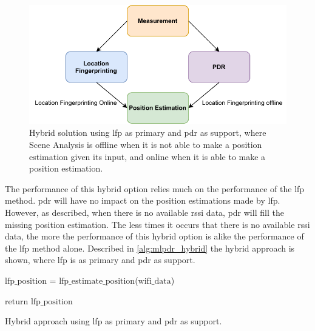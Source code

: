 \begin{figure}[H]
    \centering
    \includegraphics[scale=0.85]{Images/Experiments/hybrid/approach1.pdf}
    \caption{Hybrid solution using \gls{lfp} as primary and \gls{pdr} as support, where Scene Analysis is offline when it is not able to make a position estimation given its input, and online when it is able to make a position estimation.}
     \label{fig:hybrid1}
\end{figure}

The performance of this hybrid option relies much on the performance of the \gls{lfp} method. \gls{pdr} will have no impact on the position estimations made by \gls{lfp}. However, as described, when there is no available \gls{rssi} data, \gls{pdr} will fill the missing position estimation. The less times it occurs that there is no available \gls{rssi} data, the more the performance of this hybrid option is alike the performance of the \gls{lfp} method alone. Described in \autoref{alg:mlpdr_hybrid} the hybrid approach is shown, where \gls{lfp} is as primary and \gls{pdr} as support. 

\begin{algorithm}[H]
\SetAlgoLined
{}
  $\text{lfp\_position}$ = $\text{lfp\_estimate\_position}$($\text{wifi\_data}$)\;
  
  
  return $\text{lfp\_position}$\;
 \caption{Hybrid approach using \gls{lfp} as primary and \gls{pdr} as support.}
 \label{alg:mlpdr_hybrid}
\end{algorithm}

